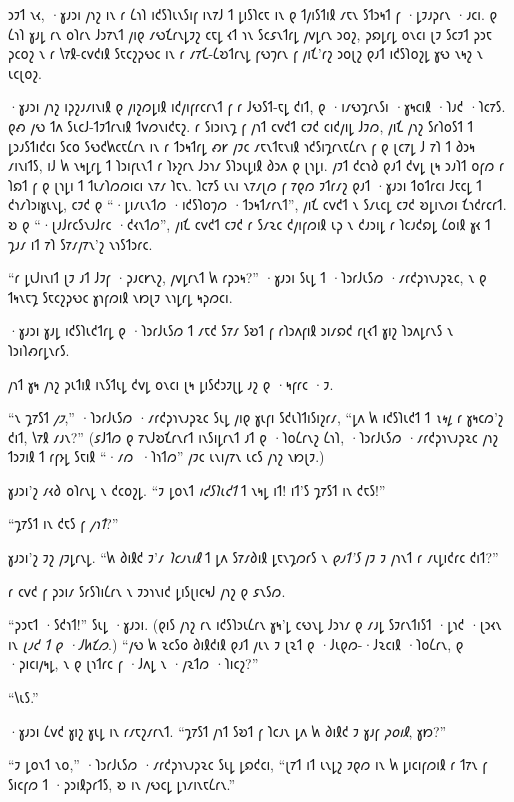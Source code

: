𐑮𐑲𐑑 𐑯𐑬, ·𐑣𐑨𐑮𐑦 𐑢𐑪𐑟 𐑦𐑯 𐑩 𐑖𐑪𐑐 𐑦𐑒𐑕𐑐𐑧𐑯𐑕𐑦𐑝 𐑦𐑯𐑳𐑓 𐑑 𐑛𐑦𐑕𐑐𐑤𐑱 𐑦𐑯 𐑞 𐑑𐑢𐑦𐑕𐑑𐑦𐑙 𐑥𐑱𐑯 𐑕𐑑𐑮𐑰𐑑 𐑝 ·𐑛𐑲𐑨𐑜𐑩𐑯 ·𐑨𐑤𐑦. 𐑞 𐑖𐑪𐑐 𐑣𐑨𐑛 𐑩𐑯 𐑴𐑐𐑩𐑯 𐑓𐑮𐑳𐑯𐑑 𐑢𐑦𐑞 𐑥𐑻𐑗𐑩𐑯𐑛𐑲𐑟 𐑤𐑱𐑛 𐑬𐑑 𐑪𐑯 𐑕𐑤𐑭𐑯𐑑𐑩𐑛 𐑢𐑫𐑛𐑩𐑯 𐑮𐑴𐑟, 𐑜𐑸𐑛𐑩𐑛 𐑴𐑯𐑤𐑦 𐑚𐑲 𐑕𐑤𐑲𐑑 𐑜𐑮𐑱 𐑜𐑤𐑴𐑟 𐑯 𐑩 𐑘𐑳𐑙-𐑤𐑫𐑒𐑦𐑙 𐑕𐑱𐑤𐑟𐑜𐑻𐑤 𐑦𐑯 𐑩 𐑥𐑳𐑗-𐑖𐑹𐑑𐑩𐑯𐑛 𐑝𐑻𐑠𐑩𐑯 𐑝 𐑢𐑦𐑗'𐑩𐑟 𐑮𐑴𐑚𐑟 𐑞𐑨𐑑 𐑦𐑒𐑕𐑐𐑴𐑟𐑛 𐑣𐑻 𐑯𐑰𐑟 𐑯 𐑧𐑤𐑚𐑴𐑟.

·𐑣𐑨𐑮𐑦 𐑢𐑪𐑟 𐑦𐑜𐑟𐑨𐑥𐑦𐑯𐑦𐑙 𐑞 𐑢𐑦𐑟𐑼𐑛𐑦𐑙 𐑦𐑒𐑢𐑦𐑝𐑩𐑤𐑩𐑯𐑑 𐑝 𐑩 𐑓𐑻𐑕𐑑-𐑱𐑛 𐑒𐑦𐑑, 𐑞 ·𐑦𐑥𐑻𐑡𐑩𐑯𐑕𐑦 ·𐑣𐑰𐑤𐑦𐑙 ·𐑐𐑨𐑒 ·𐑐𐑤𐑳𐑕. 𐑞𐑺 𐑢𐑻 𐑑𐑵 𐑕𐑧𐑤𐑓-𐑑𐑲𐑑𐑩𐑯𐑦𐑙 𐑑𐑫𐑼𐑯𐑦𐑒𐑱𐑟. 𐑩 𐑕𐑦𐑮𐑦𐑯𐑡 𐑝 𐑢𐑪𐑑 𐑤𐑫𐑒𐑑 𐑤𐑲𐑒 𐑤𐑦𐑒𐑢𐑦𐑛 𐑓𐑲𐑼, 𐑢𐑦𐑗 𐑢𐑪𐑟 𐑕𐑩𐑐𐑴𐑕𐑑 𐑑 𐑛𐑮𐑨𐑕𐑑𐑦𐑒𐑤𐑦 𐑕𐑤𐑴 𐑕𐑻𐑒𐑿𐑤𐑱𐑖𐑩𐑯 𐑦𐑯 𐑩 𐑑𐑮𐑰𐑑𐑩𐑛 𐑺𐑾 𐑢𐑲𐑤 𐑥𐑱𐑯𐑑𐑱𐑯𐑦𐑙 𐑪𐑒𐑕𐑦𐑡𐑩𐑯𐑱𐑖𐑩𐑯 𐑝 𐑞 𐑚𐑤𐑳𐑛 𐑓 𐑳𐑐 𐑑 𐑔𐑮𐑰 𐑥𐑦𐑯𐑦𐑑𐑕, 𐑦𐑓 𐑿 𐑯𐑰𐑛𐑩𐑛 𐑑 𐑐𐑮𐑦𐑝𐑧𐑯𐑑 𐑩 𐑐𐑶𐑟𐑩𐑯 𐑓𐑮𐑪𐑥 𐑕𐑐𐑮𐑧𐑛𐑦𐑙 𐑔𐑮𐑵 𐑞 𐑚𐑪𐑛𐑦. 𐑢𐑲𐑑 𐑒𐑤𐑪𐑔 𐑞𐑨𐑑 𐑒𐑫𐑛 𐑚𐑰 𐑮𐑨𐑐𐑑 𐑴𐑝𐑼 𐑩 𐑐𐑸𐑑 𐑝 𐑞 𐑚𐑪𐑛𐑦 𐑑 𐑑𐑧𐑥𐑐𐑼𐑼𐑦𐑤𐑦 𐑯𐑳𐑥 𐑐𐑱𐑯. 𐑐𐑤𐑳𐑕 𐑧𐑯𐑦 𐑯𐑳𐑥𐑚𐑼 𐑝 𐑳𐑞𐑼 𐑲𐑑𐑩𐑥𐑟 𐑞𐑨𐑑 ·𐑣𐑨𐑮𐑦 𐑑𐑴𐑑𐑩𐑤𐑦 𐑓𐑱𐑤𐑛 𐑑 𐑒𐑪𐑥𐑐𐑮𐑦𐑣𐑧𐑯𐑛, 𐑤𐑲𐑒 𐑞 “·𐑛𐑦𐑥𐑧𐑯𐑑𐑼 ·𐑦𐑒𐑕𐑐𐑴𐑠𐑼 ·𐑑𐑮𐑰𐑑𐑥𐑩𐑯𐑑”, 𐑢𐑦𐑗 𐑤𐑫𐑒𐑑 𐑯 𐑕𐑥𐑧𐑤𐑛 𐑤𐑲𐑒 𐑹𐑛𐑦𐑯𐑼𐑦 𐑗𐑪𐑒𐑩𐑤𐑩𐑑. 𐑹 𐑞 “·𐑚𐑨𐑓𐑩𐑤𐑕𐑯𐑨𐑓𐑩𐑤 ·𐑒𐑬𐑯𐑑𐑼”, 𐑢𐑦𐑗 𐑤𐑫𐑒𐑑 𐑤𐑲𐑒 𐑩 𐑕𐑥𐑷𐑤 𐑒𐑢𐑦𐑝𐑼𐑦𐑙 𐑧𐑜 𐑯 𐑒𐑨𐑮𐑦𐑛 𐑩 𐑐𐑤𐑨𐑒𐑸𐑛 𐑖𐑴𐑦𐑙 𐑣𐑬 𐑑 𐑡𐑨𐑥 𐑦𐑑 𐑳𐑐 𐑕𐑳𐑥𐑢𐑳𐑯'𐑟 𐑯𐑪𐑕𐑑𐑮𐑩𐑤.

“𐑩 𐑛𐑧𐑓𐑦𐑯𐑦𐑑 𐑚𐑲 𐑨𐑑 𐑓𐑲𐑝 ·𐑜𐑨𐑤𐑾𐑯𐑟, 𐑢𐑫𐑛𐑩𐑯𐑑 𐑿 𐑩𐑜𐑮𐑰?” ·𐑣𐑨𐑮𐑦 𐑕𐑧𐑛 𐑑 ·𐑐𐑮𐑩𐑓𐑧𐑕𐑼 ·𐑥𐑩𐑒𐑜𐑪𐑯𐑨𐑜𐑷𐑤, 𐑯 𐑞 𐑑𐑰𐑯𐑱𐑡 𐑕𐑱𐑤𐑟𐑜𐑻𐑤 𐑣𐑪𐑝𐑼𐑦𐑙 𐑯𐑽𐑚𐑲 𐑯𐑪𐑛𐑩𐑛 𐑰𐑜𐑼𐑤𐑦.

·𐑣𐑨𐑮𐑦 𐑣𐑨𐑛 𐑦𐑒𐑕𐑐𐑧𐑒𐑑𐑩𐑛 𐑞 ·𐑐𐑮𐑩𐑓𐑧𐑕𐑼 𐑑 𐑥𐑱𐑒 𐑕𐑳𐑥 𐑕𐑹𐑑 𐑝 𐑩𐑐𐑮𐑵𐑝𐑦𐑙 𐑮𐑦𐑥𐑸𐑒 𐑩𐑚𐑬𐑑 𐑣𐑦𐑟 𐑐𐑮𐑵𐑛𐑩𐑯𐑕 𐑯 𐑐𐑮𐑦𐑐𐑺𐑩𐑛𐑯𐑩𐑕.

𐑢𐑪𐑑 𐑣𐑰 𐑢𐑪𐑟 𐑜𐑧𐑑𐑦𐑙 𐑦𐑯𐑕𐑑𐑧𐑛 𐑒𐑫𐑛 𐑴𐑯𐑤𐑦 𐑚𐑰 𐑛𐑦𐑕𐑒𐑮𐑲𐑚𐑛 𐑨𐑟 𐑞 ·𐑰𐑝𐑩𐑤 ·𐑲.

“𐑯 𐑡𐑳𐑕𐑑 \emph{𐑢𐑲},” ·𐑐𐑮𐑩𐑓𐑧𐑕𐑼 ·𐑥𐑩𐑒𐑜𐑪𐑯𐑨𐑜𐑷𐑤 𐑕𐑧𐑛 𐑢𐑦𐑞 𐑣𐑧𐑝𐑦 𐑕𐑒𐑧𐑐𐑑𐑦𐑕𐑦𐑟𐑩𐑥, “𐑛𐑵 𐑿 𐑦𐑒𐑕𐑐𐑧𐑒𐑑 𐑑 \emph{𐑯𐑰𐑛} 𐑩 𐑣𐑰𐑤𐑼'𐑟 𐑒𐑦𐑑, 𐑘𐑳𐑙 𐑥𐑨𐑯?” (𐑭𐑓𐑑𐑼 𐑞 𐑳𐑯𐑓𐑹𐑗𐑩𐑯𐑩𐑑 𐑦𐑯𐑕𐑦𐑛𐑩𐑯𐑑 𐑨𐑑 𐑞 ·𐑐𐑴𐑖𐑩𐑯𐑟 𐑖𐑪𐑐, ·𐑐𐑮𐑩𐑓𐑧𐑕𐑼 ·𐑥𐑩𐑒𐑜𐑪𐑯𐑨𐑜𐑷𐑤 𐑢𐑪𐑟 𐑑𐑮𐑲𐑦𐑙 𐑑 𐑩𐑝𐑶𐑛 𐑕𐑱𐑦𐑙 “·𐑥𐑼~·𐑐𐑪𐑑𐑼” 𐑢𐑲𐑤 𐑧𐑯𐑦𐑢𐑳𐑯 𐑧𐑤𐑕 𐑢𐑪𐑟 𐑯𐑽𐑚𐑲.)

𐑣𐑨𐑮𐑦'𐑟 𐑥𐑬𐑔 𐑴𐑐𐑩𐑯𐑛 𐑯 𐑒𐑤𐑴𐑟𐑛. “𐑲 𐑛𐑴𐑯𐑑 \emph{𐑦𐑒𐑕𐑐𐑧𐑒𐑑} 𐑑 𐑯𐑰𐑛 𐑦𐑑! 𐑦𐑑'𐑕 𐑡𐑳𐑕𐑑 𐑦𐑯 𐑒𐑱𐑕!”

“𐑡𐑳𐑕𐑑 𐑦𐑯 𐑒𐑱𐑕 𐑝 \emph{𐑢𐑪𐑑}?”

𐑣𐑨𐑮𐑦'𐑟 𐑲𐑟 𐑢𐑲𐑛𐑩𐑯𐑛. “𐑿 𐑔𐑦𐑙𐑒 𐑲'𐑥 \emph{𐑐𐑤𐑨𐑯𐑦𐑙} 𐑑 𐑛𐑵 𐑕𐑳𐑥𐑔𐑦𐑙 𐑛𐑱𐑯𐑡𐑼𐑩𐑕 𐑯 \emph{𐑞𐑨𐑑'𐑕} 𐑢𐑲 𐑲 𐑢𐑪𐑯𐑑 𐑩 𐑥𐑧𐑛𐑦𐑒𐑩𐑤 𐑒𐑦𐑑?”

𐑩 𐑤𐑫𐑒 𐑝 𐑜𐑮𐑦𐑥 𐑕𐑩𐑕𐑐𐑦𐑖𐑩𐑯 𐑯 𐑲𐑮𐑪𐑯𐑦𐑒 𐑛𐑦𐑕𐑚𐑦𐑤𐑰𐑓 𐑢𐑪𐑟 𐑞 𐑭𐑯𐑕𐑼.

“𐑜𐑮𐑱𐑑 ·𐑕𐑒𐑪𐑑!” 𐑕𐑧𐑛 ·𐑣𐑨𐑮𐑦. (𐑞𐑦𐑕 𐑢𐑪𐑟 𐑩𐑯 𐑦𐑒𐑕𐑐𐑮𐑧𐑖𐑩𐑯 𐑣𐑰'𐑛 𐑤𐑻𐑯𐑛 𐑓𐑮𐑪𐑥 𐑞 𐑥𐑨𐑛 𐑕𐑲𐑩𐑯𐑑𐑦𐑕𐑑 ·𐑛𐑪𐑒 ·𐑚𐑮𐑬𐑯 𐑦𐑯 \emph{𐑚𐑨𐑒 𐑑 𐑞 ·𐑓𐑿𐑗𐑼}.) “𐑢𐑻 𐑿 𐑷𐑤𐑕𐑴 𐑔𐑦𐑙𐑒𐑦𐑙 𐑞𐑨𐑑 𐑢𐑧𐑯 𐑲 𐑚𐑷𐑑 𐑞 ·𐑓𐑧𐑞𐑼-·𐑓𐑷𐑤𐑦𐑙 ·𐑐𐑴𐑖𐑩𐑯, 𐑞 ·𐑜𐑦𐑤𐑦𐑢𐑰𐑛, 𐑯 𐑞 𐑚𐑪𐑑𐑩𐑤 𐑝 ·𐑓𐑵𐑛 𐑯 ·𐑢𐑷𐑑𐑼 ·𐑐𐑦𐑤𐑟?”

“𐑘𐑧𐑕.”

·𐑣𐑨𐑮𐑦 𐑖𐑫𐑒 𐑣𐑦𐑟 𐑣𐑧𐑛 𐑦𐑯 𐑩𐑥𐑱𐑟𐑥𐑩𐑯𐑑. “𐑡𐑳𐑕𐑑 𐑢𐑪𐑑 𐑕𐑹𐑑 𐑝 𐑐𐑤𐑨𐑯 𐑛𐑵 𐑿 𐑔𐑦𐑙𐑒 𐑲 𐑣𐑨𐑝 \emph{𐑜𐑴𐑦𐑙}, 𐑣𐑽?”

“𐑲 𐑛𐑴𐑯𐑑 𐑯𐑴,” ·𐑐𐑮𐑩𐑓𐑧𐑕𐑼 ·𐑥𐑩𐑒𐑜𐑪𐑯𐑨𐑜𐑷𐑤 𐑕𐑧𐑛 𐑛𐑸𐑒𐑤𐑦, “𐑚𐑳𐑑 𐑦𐑑 𐑧𐑯𐑛𐑟 𐑲𐑞𐑼 𐑦𐑯 𐑿 𐑛𐑦𐑤𐑦𐑝𐑼𐑦𐑙 𐑩 𐑑𐑳𐑯 𐑝 𐑕𐑦𐑤𐑝𐑼 𐑑 ·𐑜𐑮𐑦𐑙𐑜𐑩𐑑𐑕, 𐑹 𐑦𐑯 𐑢𐑻𐑤𐑛 𐑛𐑪𐑥𐑦𐑯𐑱𐑖𐑩𐑯.”

